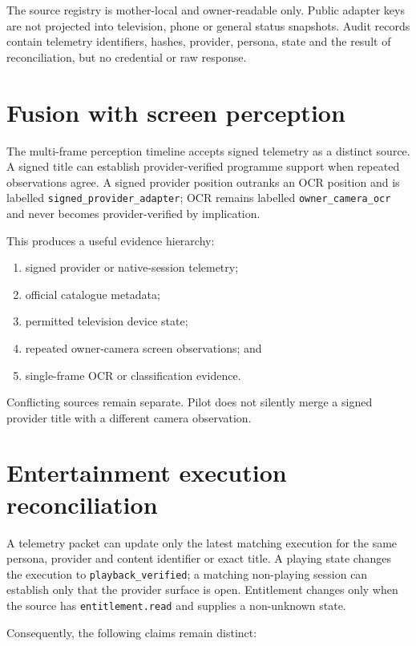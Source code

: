 \documentclass[11pt,a4paper]{article}
\begin{document}
The source registry is mother-local and owner-readable only. Public adapter keys
are not projected into television, phone or general status snapshots. Audit
records contain telemetry identifiers, hashes, provider, persona, state and the
result of reconciliation, but no credential or raw response.

\section{Fusion with screen perception}

The multi-frame perception timeline accepts signed telemetry as a distinct
source. A signed title can establish provider-verified programme support when
repeated observations agree. A signed provider position outranks an OCR position
and is labelled \texttt{signed\_provider\_adapter}; OCR remains labelled
\texttt{owner\_camera\_ocr} and never becomes provider-verified by implication.

This produces a useful evidence hierarchy:

\begin{enumerate}
  \item signed provider or native-session telemetry;
  \item official catalogue metadata;
  \item permitted television device state;
  \item repeated owner-camera screen observations; and
  \item single-frame OCR or classification evidence.
\end{enumerate}

Conflicting sources remain separate. Pilot does not silently merge a signed
provider title with a different camera observation.

\section{Entertainment execution reconciliation}

A telemetry packet can update only the latest matching execution for the same
persona, provider and content identifier or exact title. A playing state changes
the execution to \texttt{playback\_verified}; a matching non-playing session can
establish only that the provider surface is open. Entitlement changes only when
the source has \texttt{entitlement.read} and supplies a non-unknown state.

Consequently, the following claims remain distinct:
\end{document}
